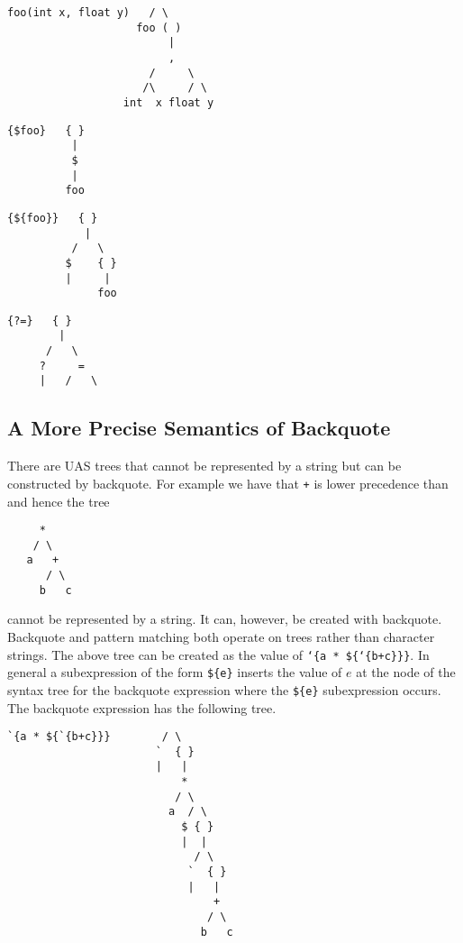 \documentclass{article}
\begin{document}
\begin{verbatim}
foo(int x, float y)   / \
                    foo ( )
                         |
                         ,
                      /     \
                     /\     / \
                  int  x float y
\end{verbatim}

\begin{verbatim}
{$foo}   { }
          |
          $
          |
         foo
\end{verbatim}

\begin{verbatim}
{${foo}}   { }
            |
          /   \
         $    { }
         |     |
              foo
\end{verbatim}

\begin{verbatim}
{?=}   { }
        |
      /   \
     ?     =
     |   /   \
\end{verbatim}

\subsection{A More Precise Semantics of Backquote}

There are UAS trees that cannot be represented by a string but can be constructed by backquote.  For example we have that {\tt +} is lower precedence than {\tt *} and hence the tree
\begin{verbatim}
     *
    / \
   a   +
      / \
     b   c
\end{verbatim}
cannot be represented by a string. It can, however, be created with backquote. Backquote and pattern matching both operate on trees rather than character strings.
The above tree can be created as the value of {\tt `\{a * \$\{`\{b+c\}\}\}}.  In general a subexpression of the form {\tt \$\{e\}} inserts the value of
$e$ at the node of the syntax tree for the backquote expression where the {\tt \$\{e\}} subexpression occurs.  The backquote expression has the following tree.

\begin{verbatim}
`{a * ${`{b+c}}}        / \
                       `  { }
                       |   |
                           *
                          / \
                         a  / \
                           $ { }
                           |  |
                             / \
                            `  { }
                            |   |
                                +
                               / \
                              b   c
\end{verbatim}
\end{document}
